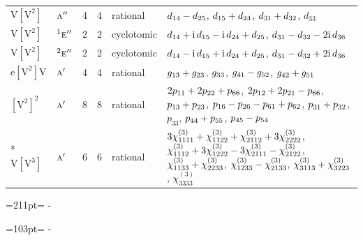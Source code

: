 \documentclass[10pt,a4paper]{article}
\newcommand{\needspace}[1]{\par\penalty-100\begingroup\dimen0=#1\relax\dimen2=\pagegoal
  \advance\dimen2-\pagetotal\ifdim\dimen0>\dimen2\relax\ifdim\dimen2>0pt\vfil\break\fi\fi
  \endgroup}
\numberwithin{equation}{section}
\newcommand{\irr}[1]{\text{\normalfont\scshape #1}}
\newcommand{\conjpair}[1]{{}^{#1}}
\newcommand{\iunit}{\mathrm{i}}
\newcommand{\jahn}[1]{\mathrm{#1}}
\newlength{\fillwidth}\newlength{\cellwidth}\newlength{\colwidth}
\newcommand{\signbreak}{\penalty100\relax}
\begin{document}
{\begin{longtable}{@{}llrrl>{\RaggedRight\arraybackslash}p{\fillwidth}@{}}
$\jahn{V[V^{2}]}$ & $\irr{a}''$ & 4 & 4 & rational & $d_{14} -\signbreak d_{25}$, $d_{15} +\signbreak d_{24}$, $d_{31} +\signbreak d_{32}$, $d_{33}$\\
$\jahn{V[V^{2}]}$ & $\conjpair{1}\irr{e}''$ & 2 & 2 & cyclotomic & $d_{14} +\signbreak \iunit{}\,d_{15} -\signbreak \iunit{}\,d_{24} +\signbreak d_{25}$, $d_{31} -\signbreak d_{32} -\signbreak 2\iunit{}\,d_{36}$\\
$\jahn{V[V^{2}]}$ & $\conjpair{2}\irr{e}''$ & 2 & 2 & cyclotomic & $d_{14} -\signbreak \iunit{}\,d_{15} +\signbreak \iunit{}\,d_{24} +\signbreak d_{25}$, $d_{31} -\signbreak d_{32} +\signbreak 2\iunit{}\,d_{36}$\\
$\jahn{e[V^{2}]V}$ & $\irr{a}'$ & 4 & 4 & rational & $\mathnormal{g}_{13} +\signbreak \mathnormal{g}_{23}$, $\mathnormal{g}_{33}$, $\mathnormal{g}_{41} -\signbreak \mathnormal{g}_{52}$, $\mathnormal{g}_{42} +\signbreak \mathnormal{g}_{51}$\\
$\jahn{[V^{2}]^{2}}$ & $\irr{a}'$ & 8 & 8 & rational & $2p_{11} +\signbreak 2p_{22} +\signbreak p_{66}$, $2p_{12} +\signbreak 2p_{21} -\signbreak p_{66}$, $p_{13} +\signbreak p_{23}$, $p_{16} -\signbreak p_{26} -\signbreak p_{61} +\signbreak p_{62}$, $p_{31} +\signbreak p_{32}$, $p_{33}$, $p_{44} +\signbreak p_{55}$, $p_{45} -\signbreak p_{54}$\\*
$\jahn{V[V^{3}]}$ & $\irr{a}'$ & 6 & 6 & rational & $3\chi^{(3)}_{1111} +\signbreak \chi^{(3)}_{1122} +\signbreak \chi^{(3)}_{2112} +\signbreak 3\chi^{(3)}_{2222}$, $\chi^{(3)}_{1112} +\signbreak 3\chi^{(3)}_{1222} -\signbreak 3\chi^{(3)}_{2111} -\signbreak \chi^{(3)}_{2122}$, $\chi^{(3)}_{1133} +\signbreak \chi^{(3)}_{2233}$, $\chi^{(3)}_{1233} -\signbreak \chi^{(3)}_{2133}$, $\chi^{(3)}_{3113} +\signbreak \chi^{(3)}_{3223}$, $\chi^{(3)}_{3333}$\\
\bottomrule\end{longtable}}
\needspace{211pt}
\needspace{103pt}
\end{document}
